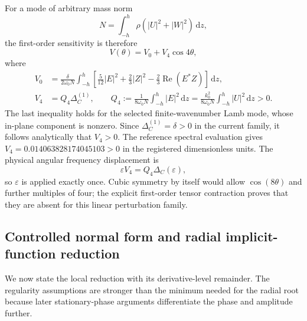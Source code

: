 For a mode of arbitrary mass norm
\begin{equation}
  N=\int_{-h}^{h}\rho(|U|^2+|W|^2)\,\mathrm dz,
  \label{eq:sagittal-mode-mass-norm}
\end{equation}
the first-order sensitivity is therefore
\begin{equation}
  V(\theta)=V_0+V_4\cos4\theta,
  \label{eq:first-order-cubic-angular-sensitivity}
\end{equation}
where
\begin{align}
  V_0
  &=\frac{\delta}{2\omega_0N}
    \int_{-h}^{h}\left[
      \frac{5}{12}|E|^2+\frac{2}{3}|Z|^2
      -\frac{2}{3}\operatorname{Re}(E^*Z)
    \right]\,\mathrm dz,                                           \label{eq:cubic-vzero}\\
  V_4
  &=Q_4\Delta_C^{(1)},
  \qquad
  Q_4:=\frac{1}{8\omega_0N}\int_{-h}^{h}|E|^2\,\mathrm dz
      =\frac{k_0^2}{8\omega_0N}\int_{-h}^{h}|U|^2\,\mathrm dz>0.
  \label{eq:cubic-vfour}
\end{align}
The last inequality holds for the selected finite-wavenumber Lamb mode,
whose in-plane component is nonzero.  Since
\(\Delta_C^{(1)}=\delta>0\) in the current family, it follows analytically
that \(V_4>0\).  The reference spectral evaluation gives
\(V_4=0.014063828174045103>0\) in the registered dimensionless units.
The physical angular frequency displacement is
\begin{equation}
  \varepsilon V_4
  =Q_4\Delta_C(\varepsilon),
  \label{eq:physical-cubic-angular-shift}
\end{equation}
so \(\varepsilon\) is applied exactly once.  Cubic symmetry by itself would
allow \(\cos(8\theta)\) and further multiples of four; the explicit
first-order tensor contraction proves that they are absent for this linear
perturbation family.

\subsection{Controlled normal form and radial implicit-function reduction}

We now state the local reduction with its derivative-level remainder.  The
regularity assumptions are stronger than the minimum needed for the radial
root because later stationary-phase arguments differentiate the phase and
amplitude further.

